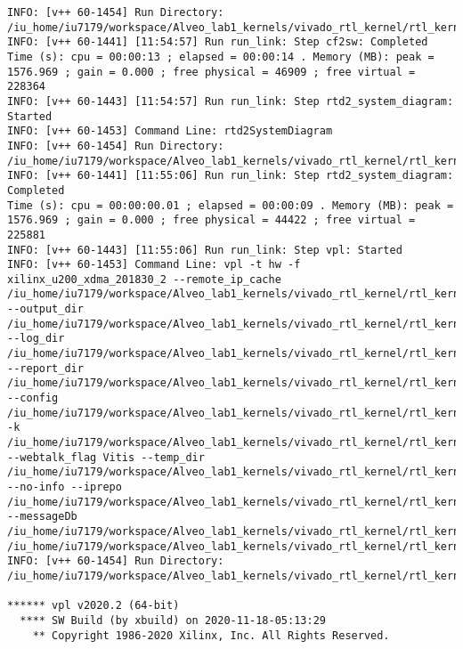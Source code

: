 \begin{lstlisting}[label=func,breaklines=true,breakatwhitespace=false,caption=СОДЕРЖИМОЕ LOG-ФАЙЛА.]
INFO: [v++ 60-1454] Run Directory: /iu_home/iu7179/workspace/Alveo_lab1_kernels/vivado_rtl_kernel/rtl_kernel_wizard_0_ex/exports/_x/link/run_link
INFO: [v++ 60-1441] [11:54:57] Run run_link: Step cf2sw: Completed
Time (s): cpu = 00:00:13 ; elapsed = 00:00:14 . Memory (MB): peak = 1576.969 ; gain = 0.000 ; free physical = 46909 ; free virtual = 228364
INFO: [v++ 60-1443] [11:54:57] Run run_link: Step rtd2_system_diagram: Started
INFO: [v++ 60-1453] Command Line: rtd2SystemDiagram
INFO: [v++ 60-1454] Run Directory: /iu_home/iu7179/workspace/Alveo_lab1_kernels/vivado_rtl_kernel/rtl_kernel_wizard_0_ex/exports/_x/link/run_link
INFO: [v++ 60-1441] [11:55:06] Run run_link: Step rtd2_system_diagram: Completed
Time (s): cpu = 00:00:00.01 ; elapsed = 00:00:09 . Memory (MB): peak = 1576.969 ; gain = 0.000 ; free physical = 44422 ; free virtual = 225881
INFO: [v++ 60-1443] [11:55:06] Run run_link: Step vpl: Started
INFO: [v++ 60-1453] Command Line: vpl -t hw -f xilinx_u200_xdma_201830_2 --remote_ip_cache /iu_home/iu7179/workspace/Alveo_lab1_kernels/vivado_rtl_kernel/rtl_kernel_wizard_0_ex/exports/.ipcache --output_dir /iu_home/iu7179/workspace/Alveo_lab1_kernels/vivado_rtl_kernel/rtl_kernel_wizard_0_ex/exports/_x/link/int --log_dir /iu_home/iu7179/workspace/Alveo_lab1_kernels/vivado_rtl_kernel/rtl_kernel_wizard_0_ex/exports/_x/logs/link --report_dir /iu_home/iu7179/workspace/Alveo_lab1_kernels/vivado_rtl_kernel/rtl_kernel_wizard_0_ex/exports/_x/reports/link --config /iu_home/iu7179/workspace/Alveo_lab1_kernels/vivado_rtl_kernel/rtl_kernel_wizard_0_ex/exports/_x/link/int/vplConfig.ini -k /iu_home/iu7179/workspace/Alveo_lab1_kernels/vivado_rtl_kernel/rtl_kernel_wizard_0_ex/exports/_x/link/int/kernel_info.dat --webtalk_flag Vitis --temp_dir /iu_home/iu7179/workspace/Alveo_lab1_kernels/vivado_rtl_kernel/rtl_kernel_wizard_0_ex/exports/_x/link --no-info --iprepo /iu_home/iu7179/workspace/Alveo_lab1_kernels/vivado_rtl_kernel/rtl_kernel_wizard_0_ex/exports/_x/link/int/xo/ip_repo/mycompany_com_kernel_rtl_kernel_wizard_0_1_0 --messageDb /iu_home/iu7179/workspace/Alveo_lab1_kernels/vivado_rtl_kernel/rtl_kernel_wizard_0_ex/exports/_x/link/run_link/vpl.pb /iu_home/iu7179/workspace/Alveo_lab1_kernels/vivado_rtl_kernel/rtl_kernel_wizard_0_ex/exports/_x/link/int/dr.bd.tcl
INFO: [v++ 60-1454] Run Directory: /iu_home/iu7179/workspace/Alveo_lab1_kernels/vivado_rtl_kernel/rtl_kernel_wizard_0_ex/exports/_x/link/run_link

****** vpl v2020.2 (64-bit)
  **** SW Build (by xbuild) on 2020-11-18-05:13:29
    ** Copyright 1986-2020 Xilinx, Inc. All Rights Reserved.


\end{lstlisting}
